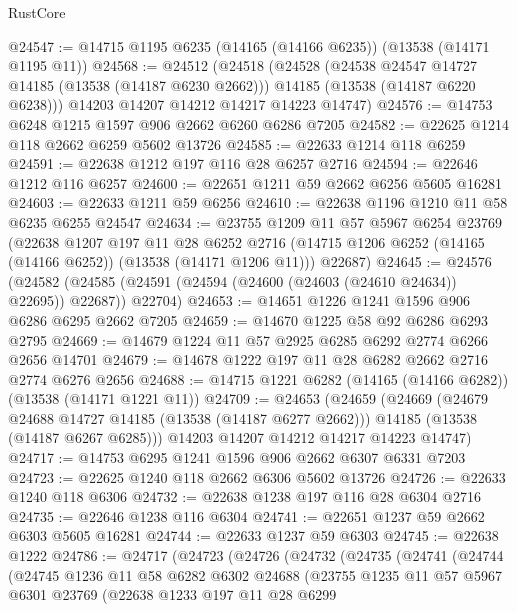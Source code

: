 \begin{lexlean}{RustCore}
\begin{coremodule}
@24547 := @14715 @1195 @6235 (@14165 (@14166 @6235)) (@13538 (@14171 @1195 @11))
@24568 := @24512
    (@24518
      (@24528
        (@24538 @24547 @14727 @14185 (@13538 (@14187 @6230 @2662)))
        @14185
        (@13538 (@14187 @6220 @6238)))
      @14203
      @14207
      @14212
      @14217
      @14223
      @14747)
@24576 := @14753 @6248 @1215 @1597 @906 @2662 @6260 @6286 @7205
@24582 := @22625 @1214 @118 @2662 @6259 @5602 @13726
@24585 := @22633 @1214 @118 @6259
@24591 := @22638 @1212 @197 @116 @28 @6257 @2716
@24594 := @22646 @1212 @116 @6257
@24600 := @22651 @1211 @59 @2662 @6256 @5605 @16281
@24603 := @22633 @1211 @59 @6256
@24610 := @22638 @1196 @1210 @11 @58 @6235 @6255 @24547
@24634 := @23755
    @1209
    @11
    @57
    @5967
    @6254
    @23769
    (@22638
      @1207
      @197
      @11
      @28
      @6252
      @2716
      (@14715 @1206 @6252 (@14165 (@14166 @6252)) (@13538 (@14171 @1206 @11)))
      @22687)
@24645 := @24576
    (@24582 (@24585 (@24591 (@24594 (@24600 (@24603 (@24610 @24634)) @22695)) @22687)) @22704)
@24653 := @14651 @1226 @1241 @1596 @906 @6286 @6295 @2662 @7205
@24659 := @14670 @1225 @58 @92 @6286 @6293 @2795
@24669 := @14679 @1224 @11 @57 @2925 @6285 @6292 @2774 @6266 @2656 @14701
@24679 := @14678 @1222 @197 @11 @28 @6282 @2662 @2716 @2774 @6276 @2656
@24688 := @14715 @1221 @6282 (@14165 (@14166 @6282)) (@13538 (@14171 @1221 @11))
@24709 := @24653
    (@24659
      (@24669
        (@24679 @24688 @14727 @14185 (@13538 (@14187 @6277 @2662)))
        @14185
        (@13538 (@14187 @6267 @6285)))
      @14203
      @14207
      @14212
      @14217
      @14223
      @14747)
@24717 := @14753 @6295 @1241 @1596 @906 @2662 @6307 @6331 @7203
@24723 := @22625 @1240 @118 @2662 @6306 @5602 @13726
@24726 := @22633 @1240 @118 @6306
@24732 := @22638 @1238 @197 @116 @28 @6304 @2716
@24735 := @22646 @1238 @116 @6304
@24741 := @22651 @1237 @59 @2662 @6303 @5605 @16281
@24744 := @22633 @1237 @59 @6303
@24745 := @22638 @1222
@24786 := @24717
    (@24723
      (@24726
        (@24732
          (@24735
            (@24741
              (@24744
                (@24745
                  @1236
                  @11
                  @58
                  @6282
                  @6302
                  @24688
                  (@23755
                    @1235
                    @11
                    @57
                    @5967
                    @6301
                    @23769
                    (@22638
                      @1233
                      @197
                      @11
                      @28
                      @6299

\end{coremodule}
\end{lexlean}
